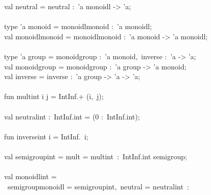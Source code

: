 \begin{isabellebody}
\begin{isamarkuptext}
\hspace*{0pt}val neutral = {}neutral :~'a monoidl -> 'a;\\
\hspace*{0pt}\\
\hspace*{0pt}type 'a monoid = {}monoidl{}monoid :~'a monoidl{};\\
\hspace*{0pt}val monoidl{}monoid = {}monoidl{}monoid :~'a monoid -> 'a monoidl;\\
\hspace*{0pt}\\
\hspace*{0pt}type 'a group = {}monoid{}group :~'a monoid,~inverse :~'a -> 'a{};\\
\hspace*{0pt}val monoid{}group = {}monoid{}group :~'a group -> 'a monoid;\\
\hspace*{0pt}val inverse = {}inverse :~'a group -> 'a -> 'a;\\
\hspace*{0pt}\\
\hspace*{0pt}fun mult{}int i j = IntInf.+ (i,~j);\\
\hspace*{0pt}\\
\hspace*{0pt}val neutral{}int :~IntInf.int = (0 :~IntInf.int);\\
\hspace*{0pt}\\
\hspace*{0pt}fun inverse{}int i = IntInf.{}~i;\\
\hspace*{0pt}\\
\hspace*{0pt}val semigroup{}int = {}mult = mult{}int{}~:~IntInf.int semigroup;\\
\hspace*{0pt}\\
\hspace*{0pt}val monoidl{}int =\\
\hspace*{0pt} ~{}semigroup{}monoidl = semigroup{}int,~neutral = neutral{}int{}~:\\

\end{isamarkuptext}
\end{isabellebody}
